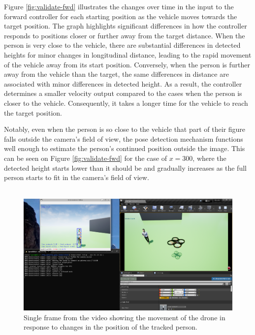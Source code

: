 Figure \ref{fig:validate-fwd} illustrates the changes over time in the input to the forward controller for each starting position as the vehicle moves towards the target position. The graph highlights significant differences in how the controller responds to positions closer or further away from the target distance. When the person is very close to the vehicle, there are substantial differences in detected heights for minor changes in longitudinal distance, leading to the rapid movement of the vehicle away from its start position. Conversely, when the person is further away from the vehicle than the target, the same differences in distance are associated with minor differences in detected height. As a result, the controller determines a smaller velocity output compared to the cases when the person is closer to the vehicle. Consequently, it takes a longer time for the vehicle to reach the target position.

Notably, even when the person is so close to the vehicle that part of their figure falls outside the camera's field of view, the pose detection mechanism functions well enough to estimate the person's continued position outside the image. This can be seen on Figure \ref{fig:validate-fwd} for the case of $x=300$, where the detected height starts lower than it should be and gradually increases as the full person starts to fit in the camera's field of view.
\\ \\


\begin{figure}[H]
  \centering
  \includegraphics[width=\textwidth, keepaspectratio]{img/video-follow-sitl.png}
  \caption{Single frame from the video showing the movement of the drone in response to changes in the position of the tracked person.}
  \label{fig:airsim-test-follow}
\end{figure}

